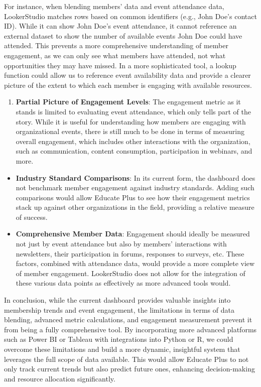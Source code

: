 \documentclass[11pt,a4paper,]{article}
\providecommand{\tightlist}{%
  \setlength{\itemsep}{0pt}\setlength{\parskip}{0pt}}
\begin{document}
For instance, when blending members' data and event attendance data, LookerStudio matches rows based on common identifiers (e.g., John Doe's contact ID). While it can show John Doe's event attendance, it cannot reference an external dataset to show the number of available events John Doe could have attended. This prevents a more comprehensive understanding of member engagement, as we can only see what members have attended, not what opportunities they may have missed. In a more sophisticated tool, a lookup function could allow us to reference event availability data and provide a clearer picture of the extent to which each member is engaging with available resources.

\begin{enumerate}
\def\labelenumi{\arabic{enumi}.}
\setcounter{enumi}{2}
\tightlist
\item
  \textbf{Partial Picture of Engagement Levels}: The engagement metric as it stands is limited to evaluating event attendance, which only tells part of the story. While it is useful for understanding how members are engaging with organizational events, there is still much to be done in terms of measuring overall engagement, which includes other interactions with the organization, such as communication, content consumption, participation in webinars, and more.
\end{enumerate}

\begin{itemize}
\item
  \textbf{Industry Standard Comparisons}: In its current form, the dashboard does not benchmark member engagement against industry standards. Adding such comparisons would allow Educate Plus to see how their engagement metrics stack up against other organizations in the field, providing a relative measure of success.
\item
  \textbf{Comprehensive Member Data}: Engagement should ideally be measured not just by event attendance but also by members' interactions with newsletters, their participation in forums, responses to surveys, etc. These factors, combined with attendance data, would provide a more complete view of member engagement. LookerStudio does not allow for the integration of these various data points as effectively as more advanced tools would.
\end{itemize}

In conclusion, while the current dashboard provides valuable insights into membership trends and event engagement, the limitations in terms of data blending, advanced metric calculations, and engagement measurement prevent it from being a fully comprehensive tool. By incorporating more advanced platforms such as Power BI or Tableau with integrations into Python or R, we could overcome these limitations and build a more dynamic, insightful system that leverages the full scope of data available. This would allow Educate Plus to not only track current trends but also predict future ones, enhancing decision-making and resource allocation significantly.
\end{document}
